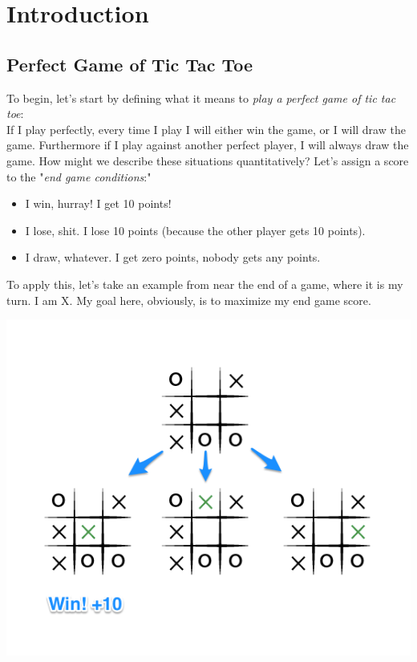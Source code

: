 \chapter{Introduction}

\section{Perfect Game of Tic Tac Toe}

To begin, let's start by defining what it means to \emph{play a perfect game of tic tac toe}: \\ 

If I play perfectly, every time I play I will either win the game, or I will draw the game. Furthermore if I play against another perfect player, I will always draw the game. How might we describe these situations quantitatively? Let's assign a score to the "\emph{end game conditions}:"

\begin{itemize}
	\itemsep-0.5em 
	\item I win, hurray! I get 10 points!
    \item I lose, shit. I lose 10 points (because the other player gets 10 points).
    \item I draw, whatever. I get zero points, nobody gets any points.
\end{itemize}

To apply this, let's take an example from near the end of a game, where it is my turn. I am X. My goal here, obviously, is to maximize my end game score.\\

\begin{center}
\includegraphics[width=1.1\textwidth]{./a-contrived-end-state-for-a-tic-tac-toe-game}
\end{center}

